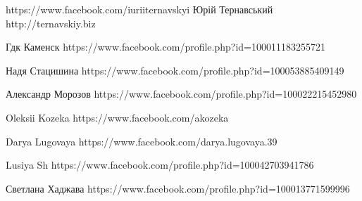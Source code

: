  
 
 
 
 

https://www.facebook.com/iuriiternavskyi
Юрій Тернавський
http://ternavskiy.biz






Гдк Каменск
https://www.facebook.com/profile.php?id=100011183255721

Надя Стацишина
https://www.facebook.com/profile.php?id=100053885409149

Александр Морозов
https://www.facebook.com/profile.php?id=100022215452980

Oleksii Kozeka
https://www.facebook.com/akozeka

Darya Lugovaya
https://www.facebook.com/darya.lugovaya.39

Lusiya Sh
https://www.facebook.com/profile.php?id=100042703941786

Светлана Хаджава
https://www.facebook.com/profile.php?id=100013771599996
